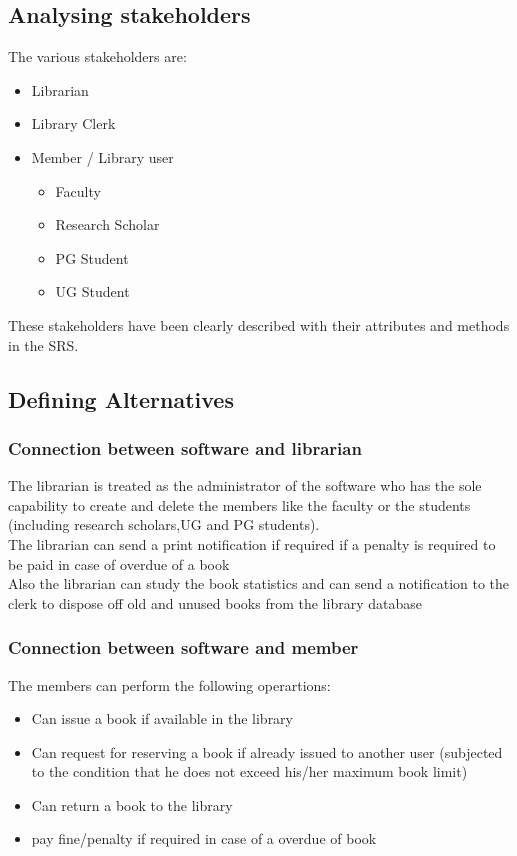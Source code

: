 \documentclass[a4paper]{article}
\begin{document}
\subsection{Analysing stakeholders}
The various stakeholders are:
\begin{itemize}
\item Librarian
\item Library Clerk
\item Member / Library user
	\begin{itemize}
	\item Faculty
	\item Research Scholar
	\item PG Student
	\item UG Student
	\end{itemize}
\end{itemize}
These stakeholders have been clearly described with their attributes and methods in the SRS.
\subsection{Defining Alternatives}
\subsubsection{Connection between software and librarian}
The librarian is treated as the administrator of the software who has the sole capability to create and delete the members like the faculty or the students (including research scholars,UG and PG students).
\\The librarian can  send a print notification if required if a penalty is required to be paid in case of overdue of a book
\\Also the librarian can study the book statistics and can send a notification to the clerk to dispose off old and unused books from the library database
\subsubsection{Connection between software and member}
The members can perform the following operartions:
\begin{itemize}
\item Can issue a book if available in the library
\item Can request for reserving a book if already issued to another user (subjected to the condition that he does not exceed his/her maximum book limit)
\item Can return a book to the library
\item pay fine/penalty if required in case of a overdue of book
\end{itemize}
\end{document}
